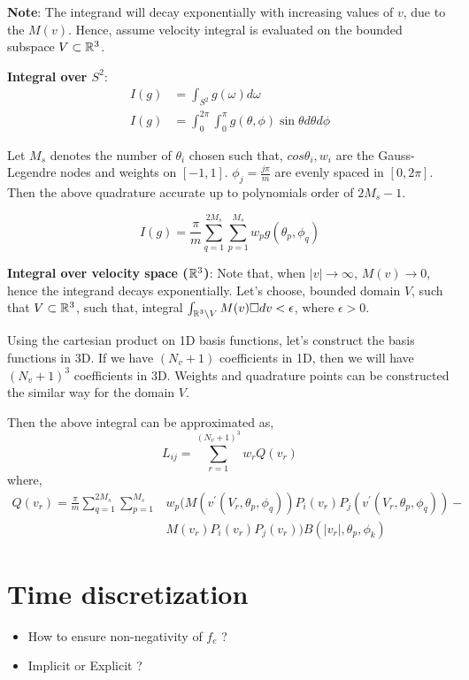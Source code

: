 \documentclass{article}
\begin{document}
\textbf{Note}: The integrand will decay exponentially with increasing values of $v$, due to the $M(v)$. Hence, assume velocity integral is evaluated on the bounded subspace $V\subset \mathbb{R}^3$.

\textbf{Integral over $S^2$}: 
\begin{align}
    I(g) &= \int_{S^2} g(\omega) d\omega\\
    I(g) &= \int_{0}^{2\pi} \int_{0}^{\pi} g(\theta,\phi) \sin\theta d\theta d\phi 
\end{align}

Let $M_s$ denotes the number of $\theta_i$ chosen such that, $cos\theta_i,w_i$ are the Gauss-Legendre nodes and weights on $[-1,1]$. $\phi_j = \frac{j\pi}{m}$  are evenly spaced in $[0,2\pi]$. Then the above quadrature accurate up to polynomials order of $2M_s-1$.

\begin{equation}
    I(g) = \frac{\pi}{m} \sum_{q=1}^{2M_s} \sum_{p=1}^{M_s} w_p g(\theta_p,\phi_q) \label{eq:sphere_quadrature}
\end{equation}

\textbf{Integral over velocity space ($\mathbb{R}^3$)}: Note that, when $|v|\rightarrow \infty$, $M(v)\rightarrow 0$, hence the integrand decays exponentially. Let's choose, bounded domain $V$, such that $V\subset \mathbb{R}^3$, such that, integral $\int_{\mathbb{R}^3\setminus V} M(v) \square dv < \epsilon$, where $\epsilon >0$. 

Using the cartesian product on 1D basis functions, let's construct the basis functions in 3D. If we have $(N_v +1)$ coefficients in 1D, then we will have $(N_v+1)^3$ coefficients in 3D. Weights and quadrature points can be constructed the similar way for the domain $V$.  

Then the above integral can be approximated as, 
\begin{equation}
    L_{ij} = \sum_{r=1}^{(N_v+1)^3} w_r Q(v_r)
\end{equation} where, 
\begin{align}
    Q(v_r) = \frac{\pi}{m} \sum_{q=1}^{2M_s} \sum_{p=1}^{M_s} &w_p (M(v^\prime(V_r,\theta_p,\phi_q)) P_i(v_r)P_j(v^\prime(V_r,\theta_p,\phi_q))  -\\& M(v_r) P_i(v_r) P_j(v_r) )  B(|v_r|,\theta_p,\phi_k) \nonumber
\end{align}





    




\section{Time discretization}
\label{sec:time_discretization}

\begin{itemize}
    \item How to ensure non-negativity of $f_e$ ? 
    \item Implicit or Explicit ? 
\end{itemize}



\end{document}
